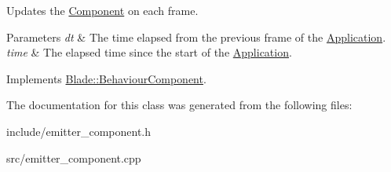 Updates the \hyperlink{class_blade_1_1_component}{Component} on each frame. 


\begin{DoxyParams}{Parameters}
{\em dt} & The time elapsed from the previous frame of the \hyperlink{class_blade_1_1_application}{Application}. \\
\hline
{\em time} & The elapsed time since the start of the \hyperlink{class_blade_1_1_application}{Application}. \\
\hline
\end{DoxyParams}


Implements \hyperlink{class_blade_1_1_behaviour_component_a90ec3079534ea1f7225c676881b30c17}{Blade\+::\+Behaviour\+Component}.



The documentation for this class was generated from the following files\+:\begin{DoxyCompactItemize}
\item 
include/emitter\+\_\+component.\+h\item 
src/emitter\+\_\+component.\+cpp\end{DoxyCompactItemize}
